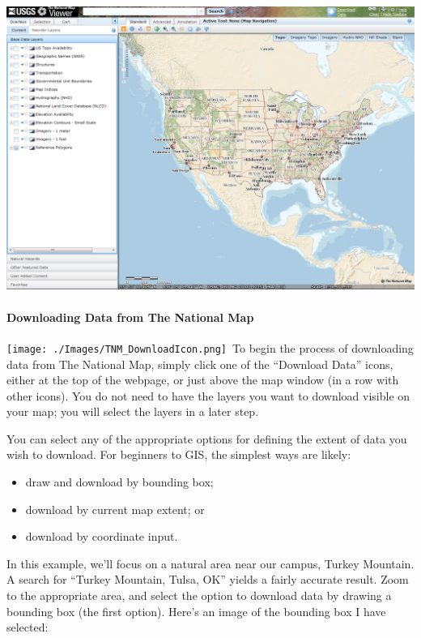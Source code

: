 \documentclass[12pt,]{article}
\begin{document}
\includegraphics{../Assignment_Images/TNM_Image.PNG}\\

\paragraph{Downloading Data from The National
Map}\label{downloading-data-from-the-national-map}

\texttt{[image: ./Images/TNM\_DownloadIcon.png]}~To begin the process of
downloading data from The National Map, simply click one of the
``Download Data'' icons, either at the top of the webpage, or just above
the map window (in a row with other icons). You do not need to have the
layers you want to download visible on your map; you will select the
layers in a later step.

You can select any of the appropriate options for defining the extent of
data you wish to download. For beginners to GIS, the simplest ways are
likely:

\begin{itemize}
\itemsep1pt\parskip0pt
\item
  draw and download by bounding box;
\item
  download by current map extent; or
\item
  download by coordinate input.
\end{itemize}

In this example, we'll focus on a natural area near our campus, Turkey
Mountain. A search for ``Turkey Mountain, Tulsa, OK'' yields a fairly
accurate result. Zoom to the appropriate area, and select the option to
download data by drawing a bounding box (the first option). Here's an
image of the bounding box I have selected:
\end{document}
